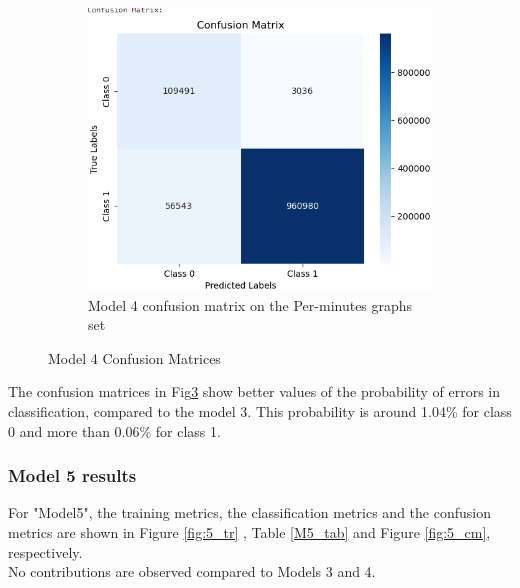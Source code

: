\begin{figure}[H]
\begin{subfigure}{0.49\textwidth}
    \label{fig:do_1_cm2}
    \end{subfigure}
    \begin{subfigure}{0.49\textwidth}
        \centering
        \includegraphics[width=\linewidth]{figures/ev/do_1_cm3.png}
        \caption{Model 4 confusion matrix on the Per-minutes graphs set}
    \label{fig:do_1_cm3}
    \end{subfigure}
    \captionsetup{font=large}
    \caption{Model 4 Confusion Matrices}
    \label{fig:4_cm}
\end{figure}
The confusion matrices in Fig\ref{fig:4_cm} show better values of the probability of errors in classification, compared to the model 3.  This probability is around 1.04\%  for class 0  and more than 0.06\% for class 1.
\subsubsection{Model 5 results}
   For "Model5", the training metrics, the classification metrics and the confusion metrics are shown in Figure \ref{fig:5_tr} , Table \ref{M5_tab} and Figure \ref{fig:5_cm}, respectively.\\ No contributions are observed compared to Models 3 and 4. 

